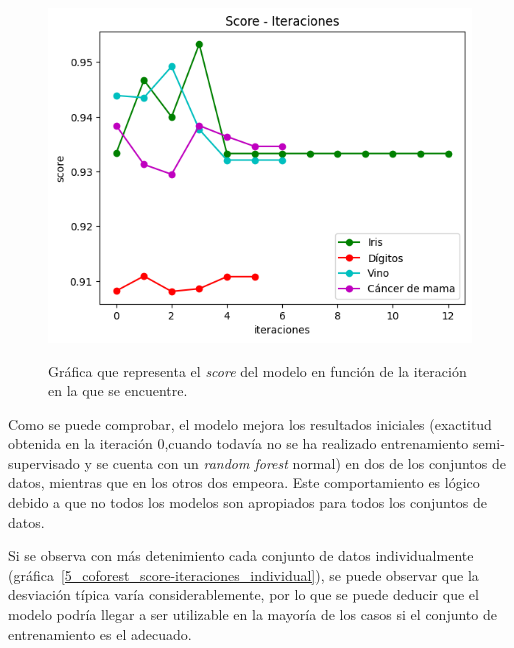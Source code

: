 \begin{figure}[h]
	\caption{Gráfica que representa el \textit{score} del modelo en función de la iteración en la que se encuentre.}
	\centering
	\includegraphics[width=\textwidth]{../img/memoria/5_coforest_score-iteraciones}
	\label{5_coforest_score-iteraciones}
\end{figure}

Como se puede comprobar, el modelo mejora los resultados iniciales (exactitud obtenida en la iteración $0$,cuando todavía no se ha realizado entrenamiento semi-supervisado y se cuenta con un \textit{random forest} normal) en dos de los conjuntos de datos, mientras que en los otros dos empeora. Este comportamiento es lógico debido a que no todos los modelos son apropiados para todos los conjuntos de datos. 

Si se observa con más detenimiento cada conjunto de datos individualmente (gráfica~\ref{5_coforest_score-iteraciones_individual}), se puede observar que la desviación típica varía considerablemente, por lo que se puede deducir que el modelo podría llegar a ser utilizable en la mayoría de los casos si el conjunto de entrenamiento es el adecuado.

